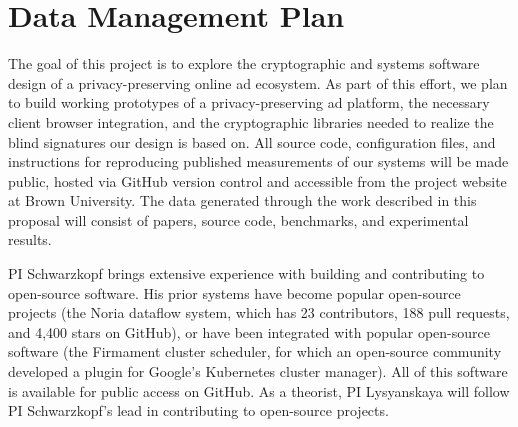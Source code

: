 \section*{Data Management Plan}

%
%
%
%
%

%
The goal of this project is to explore the cryptographic and systems software
design of a privacy-preserving online ad ecosystem.
%
As part of this effort, we plan to build working prototypes of a
privacy-preserving ad platform, the necessary client browser integration, and
the cryptographic libraries needed to realize the blind signatures our design
is based on.
%
All source code, configuration files, and instructions for reproducing published
measurements of our systems will be made public, hosted via GitHub version
control and accessible from the project website at Brown University.
%
The data generated through the work described in this proposal will consist of
papers, source code,  benchmarks, and experimental results.
%

%
PI Schwarzkopf brings extensive experience with building and contributing to open-source
software.
%
His prior systems have become popular open-source projects (\eg the
Noria dataflow system, which has 23 contributors, 188 pull requests, and 4,400 stars
on GitHub), or have been integrated with popular open-source software (\eg the
Firmament cluster scheduler, for which an open-source community developed a
plugin for Google's Kubernetes cluster manager).
%
All of this software is available for public access on GitHub.
%
As a theorist, PI Lysyanskaya will follow PI Schwarzkopf's lead in contributing to open-source projects.

